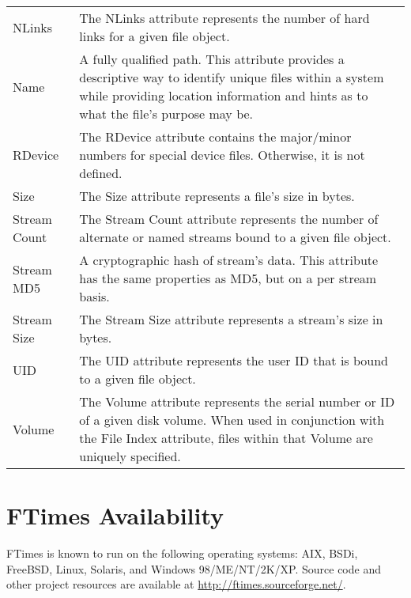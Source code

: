 \documentclass[10pt]{article}
\begin{document}
\begin{center}
\begin{supertabular}{lp{4.75in}}
NLinks
&
The NLinks attribute represents the number of hard links for a
given file object.
\\[.5em]
Name
&
A fully qualified path.  This attribute provides a descriptive way
to identify unique files within a system while providing location
information and hints as to what the file's purpose may be.
\\[.5em]
RDevice
&
The RDevice attribute contains the major/minor numbers for special
device files.  Otherwise, it is not defined.
\\[.5em]
Size
&
The Size attribute represents a file's size in bytes.
\\[.5em]
Stream Count
&
The Stream Count attribute represents the number of alternate or
named streams bound to a given file object.
\\[.5em]
Stream MD5
&
A cryptographic hash of stream's data.  This attribute has the
same properties as MD5, but on a per stream basis.
\\[.5em]
Stream Size
&
The Stream Size attribute represents a stream's size in bytes.
\\[.5em]
UID
&
The UID attribute represents the user ID that is bound to a given
file object.
\\[.5em]
Volume
&
The Volume attribute represents the serial number or ID of a given
disk volume.  When used in conjunction with the File Index attribute,
files within that Volume are uniquely specified.
\\[.5em]
\end{supertabular}
\end{center}

\section{FTimes Availability}

FTimes is known to run on the following operating systems: AIX, BSDi,
FreeBSD, Linux, Solaris, and Windows 98/ME/NT/2K/XP.  Source code and
other project resources are available at \href{http://ftimes.sourceforge.net/}
{http://ftimes.sourceforge.net/}.



\end{document}
